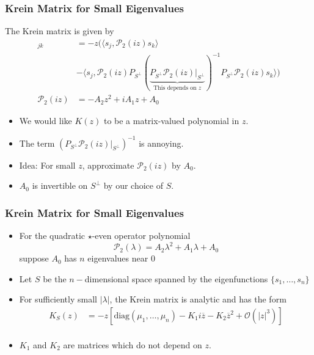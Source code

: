 \documentclass[16pt]{beamer}
\newcommand{\calP}{\mathcal{P}}
\begin{document}
\begin{frame}
\frametitle{Krein Matrix for Small Eigenvalues}
	The Krein matrix is given by
	\begin{align*}
        [K_S(z)]_{jk} &= -z \Big( 
        \langle s_j , \calP_2(iz)s_k\rangle \\
        &- \langle s_j , \calP_2(iz) P_{S^{\perp}} (\underbrace{P_{S^{\perp}} \calP_2(iz)|_{S^{\perp}} }_{\text{This depends on }z})^{-1} P_{S^{\perp}} \calP_2(iz) s_k \rangle \Big) \\
        \calP_2(iz) &= -A_2 z^2 + i A_1 z + A_0
    \end{align*}

    \begin{itemize}
    \item<1-> We would like $K(z)$ to be a matrix-valued polynomial in $z$.
    \item<2-> The term $(P_{S^{\perp}} \calP_2(iz)|_{S^{\perp}})^{-1}$ is annoying.
    \item<3-> Idea: For small $z$, approximate $\calP_2(iz)$ by $A_0$.
    \item<4-> $A_0$ is invertible on $S^\perp$ by our choice of $S$.
	\end{itemize}
\end{frame}

\begin{frame}
\frametitle{Krein Matrix for Small Eigenvalues}
	\begin{lemma}[Kapitula et al., 2019]
	\begin{itemize}
	\item For the quadratic $\star$-even operator polynomial
	\[ \calP_2(\lambda) = A_2 \lambda^2 + A_1 \lambda + A_0 \]
	suppose $A_0$ has $n$ eigenvalues near 0
	\item Let $S$ be the $n-$dimensional space spanned by the eigenfunctions $\{s_1, \dots, s_n \}$
	\item For sufficiently small $|\lambda|$, the Krein matrix is analytic and has the form
	\begin{align*}
	K_S(z) &= -z\left[ \text{diag}(\mu_1, \dots, \mu_n) - K_1 i \overline{z} - K_2 \overline{z}^2 + \mathcal{O}(|z|^3)\right] \\
	\end{align*}
	\item $K_1$ and $K_2$ are matrices which do not depend on $z$.
    \end{itemize}

	\end{lemma}
\end{frame}
\end{document}

